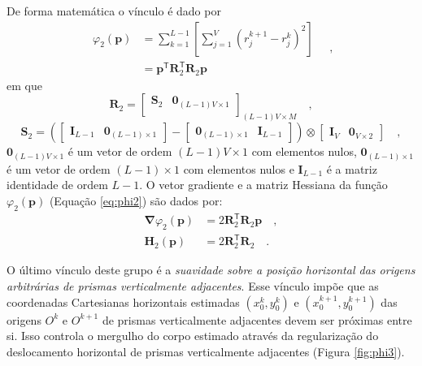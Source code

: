 De forma matemática o vínculo é dado por
\begin{equation}\label{eq:phi2}
\begin{split}
\varphi_{2}(\mathbf{p}) &= \sum\limits^{L-1}_{k=1}\left[\sum\limits^{V}_{j=1}\left(r^{k+1}_{j}-r^{k}_{j}\right)^2\right] \\
&= \mathbf{p}^{\mathsf{T}} \mathbf{R}^{\mathsf{T}}_{2}\mathbf{R}_{2}\mathbf{p}
\end{split} \quad ,
\end{equation}
em que
\begin{equation}
\mathbf{R}_{2} = 
\begin{bmatrix}
\mathbf{S}_{2} & \mathbf{0}_{(L-1)V \times 1} \\
\end{bmatrix}_{(L-1)V \times M} \quad ,
\label{eq:R2-matrix}
\end{equation}
\begin{equation}
\mathbf{S}_{2} =
\left( 
\begin{bmatrix} \mathbf{I}_{L-1} & \mathbf{0}_{(L-1) \times 1} \end{bmatrix} -
\begin{bmatrix} \mathbf{0}_{(L-1) \times 1} & \mathbf{I}_{L-1} \end{bmatrix} 
\right) \otimes 
\begin{bmatrix} \mathbf{I}_{V} & \mathbf{0}_{V \times 2} \end{bmatrix} \quad ,
\label{eq:S2-matrix}
\end{equation}
$\mathbf{0}_{(L-1)V \times 1}$ é um vetor de ordem $(L-1)V \times 1$ com elementos nulos,
$\mathbf{0}_{(L-1) \times 1}$ é um vetor de ordem $(L-1) \times 1$ com elementos nulos e 
$\mathbf{I}_{L-1}$ é a matriz identidade de ordem $L-1$. O vetor gradiente e a matriz Hessiana da função $\varphi_{2}(\mathbf{p})$ (Equação \ref{eq:phi2}) são dados por:
\begin{equation}\label{eq:phi2_gh}
\begin{split}
\boldsymbol{\nabla}\varphi_{2}(\mathbf{p}) &= 2\mathbf{R}^\mathsf{T}_{2}\mathbf{R}_{2}\mathbf{p} \quad ,\\
\mathbf{H}_{2}(\mathbf{p}) &= 2\mathbf{R}^\mathsf{T}_{2}\mathbf{R}_{2} \quad .
\end{split}
\end{equation}

O último vínculo deste grupo é a \textit{suavidade sobre a posição horizontal das origens arbitrárias de prismas verticalmente adjacentes}. Esse vínculo impõe que as coordenadas Cartesianas horizontais estimadas $(x_{0}^{k}, y_{0}^{k})$ e $(x_{0}^{k+1}, y_{0}^{k+1})$ das origens $O^{k}$ e $O^{k+1}$ 
de prismas verticalmente adjacentes devem ser próximas entre si. Isso controla o mergulho do corpo estimado através da regularização do deslocamento horizontal de prismas verticalmente adjacentes (Figura \ref{fig:phi3}).

